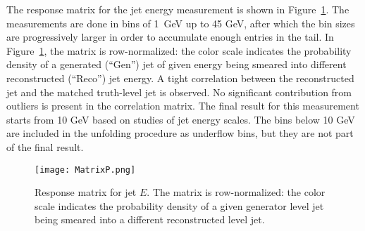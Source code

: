 \documentclass[aps,preprint,superscriptaddress,groupedaddress]{revtex4}  %
\begin{document}
The response matrix for the jet energy measurement is shown in Figure~\ref{Figure:ResponseJetP}.  The measurements are done in bins of 1~GeV up to 45 GeV, after which the bin sizes are progressively larger in order to accumulate enough entries in the tail. In Figure~\ref{Figure:ResponseJetP}, the matrix is row-normalized: the color scale indicates the probability density of a generated (``Gen'') jet of given energy being smeared into different reconstructed (``Reco'') jet energy.  A tight correlation between the reconstructed jet and the matched truth-level jet is observed. No significant contribution from outliers is present in the correlation matrix.  The final result for this measurement starts from 10 GeV based on studies of jet energy scales.  The bins below 10 GeV are included in the unfolding procedure as underflow bins, but they are not part of the final result.
%
\begin{figure}
    \centering
    \texttt{[image: MatrixP.png]}
    \caption{Response matrix for jet $E$.  The matrix is row-normalized: the color scale indicates the probability density of a given generator level jet being smeared into a different reconstructed level jet.}
    \label{Figure:ResponseJetP}
\end{figure}
\end{document}
